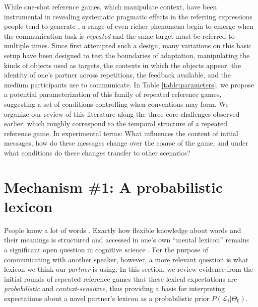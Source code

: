 While one-shot reference games, which manipulate context, have been instrumental in revealing systematic pragmatic effects in the referring expressions people tend to generate \cite{KraussWeinheimer67_ReferentSimilarity,KoolenGattGoudbeekKrahmer11_Overspecification,GrafEtAl16_BasicLevel,VanDeemter16_ComputationalModelsOfReferring}, a range of even richer phenomena begin to emerge when the communication task is \emph{repeated} and the same target must be referred to multiple times. Since  first attempted such a design, many variations on this basic setup have been designed to test the boundaries of adaptation, manipulating the kinds of objects used as targets, the contexts in which the objects appear, the identity of one's partner across repetitions, the feedback available, and the medium participants use to communicate. In Table \ref{table:parameters}, we propose a potential parameterization of this family of repeated reference games, suggesting a set of conditions controlling when conventions may form. We organize our review of this literature along the three core challenges observed earlier, which roughly correspond to the temporal structure of a repeated reference game. In experimental terms: What influences the content of initial messages, how do these messages change over the coarse of the game, and under what conditions do these changes transfer to other scenarios?   %



\section{Mechanism \#1: A probabilistic lexicon}

People know a lot of words \cite{BergelsonAslin17_Lexicon}. Exactly how flexible knowledge about words and their meanings is structured and accessed in one's own ``mental lexicon'' remains a significant open question in cognitive science \cite{JonesEtAl15_SemanticMemory,GriffithsSteyversTenenbaum07_Topics,HuthEtAl16_SemanticMaps,GoodmanLassiter14_Semantics}. For the purpose of communicating with another speaker, however, a more relevant question is what lexicon we think our \emph{partner} is using. In this section, we review evidence from the initial rounds of repeated reference games that these lexical expectations are \emph{probabilistic} and \emph{context-sensitive}, thus providing a basis for interpreting expectations about a novel partner's lexicon as a probabilistic prior $P(\mathcal{L}_i | \Theta_0)$. 

